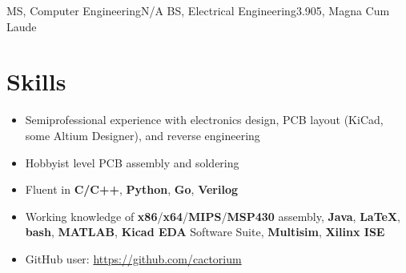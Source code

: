 \documentclass{my_resume}
\begin{document}

    {MS, Computer Engineering}{N/A}
	{BS, Electrical Engineering}{3.905, Magna Cum Laude}

\section{Skills}
\begin{itemize}
    \item Semiprofessional experience with electronics design, PCB layout (KiCad, some Altium Designer), and reverse engineering
    \item Hobbyist level PCB assembly and soldering
    \item Fluent in \textbf{C/C++}, \textbf{Python}, \textbf{Go}, \textbf{Verilog}
    \item Working knowledge of \textbf{x86}/\textbf{x64}/\textbf{MIPS}/\textbf{MSP430} assembly, \textbf{Java}, \textbf{LaTeX}, \textbf{bash}, \textbf{MATLAB}, \textbf{Kicad EDA} Software Suite, \textbf{Multisim}, \textbf{Xilinx ISE}
    \item GitHub user: \url{https://github.com/cactorium}
\end{itemize}
\end{document}
